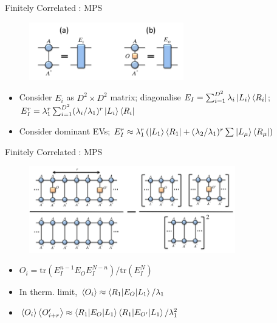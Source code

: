 \documentclass{beamer}
\begin{document}
\begin{frame}{Finitely Correlated : MPS}
		\begin{figure}[h]
		\includegraphics[width=0.6\textwidth]{fincor}
		\centering
		\end{figure}
	\begin{itemize}
		\item Consider ${ E_{i} }$ as ${ D^2 \times D^2  }$ matrix; diagonalise ${ E_{I} =\sum_{i=1}^{D^2 } \lambda _{i}\ket{L_{i}}\bra{R_{i}}}$; ${ E_{I}^{r}=\lambda _{1}^{r}\sum_{i=1}^{D^2 } (\lambda _{i}/\lambda _{1})^{r}\ket{L_{i}}\bra{R_{i}} }$
		\item Consider dominant EVs; ${ E_{I}^{r}\approx \lambda _{1}^{r}\left( \ket{L_{1}}\bra{R_{1}}+(\lambda _{2}/\lambda _{1})^{r} \sum_{}^{} \ket{L_{\mu }}\bra{R_{\mu }}\right)  }$
	\end{itemize}
\end{frame}

\begin{frame}{Finitely Correlated : MPS}
	\begin{figure}[h]
	\includegraphics[width=0.8\textwidth]{corr}
	\centering
	\end{figure}
\begin{itemize}
	\item ${O_{i}}=\text{tr}(E_{I}^{n-1}E_{O}E_{I}^{N-n}) /\text{tr}(E_{I}^{N})$\\
	\item	In therm. limit, ${ \ev{O_{i}}\approx \ev{R_{1}|E_{O}|L_{1}}/\lambda _{1}}$
\item ${ \ev{O_{i}}\ev{O^{\prime}_{i+r}}\approx \ev{R_{1}|E_{O}|L_{1}}\ev{R_{1}|E_{O^{\prime}}|L_{1}}/\lambda _{1}^{2} }$

\end{itemize}
\end{frame}
\end{document}
